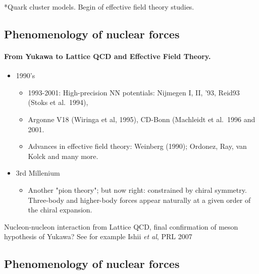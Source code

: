 \documentclass[%
twoside,                 %
final,                   %
10pt]{article}
\begin{document}
\noindent
*Quark cluster models. Begin of effective field theory studies.



\subsection*{Phenomenology of nuclear forces}

\paragraph{From Yukawa to Lattice QCD and Effective Field Theory.}

\begin{itemize}
\item 1990's
\begin{itemize}

  \item 1993-2001: High-precision NN potentials: Nijmegen I, II, '93, Reid93 (Stoks et al.~1994), 

  \item Argonne V18 (Wiringa et al, 1995), CD-Bonn (Machleidt et al.~1996 and 2001. 

  \item Advances in effective field theory: Weinberg (1990); Ordonez, Ray, van Kolck and many more.

\end{itemize}

\noindent
\item 3rd Millenium
\begin{itemize}

  \item Another "pion theory"; but now right: constrained by chiral symmetry. Three-body and higher-body forces appear naturally at a given order of the chiral expansion. 
\end{itemize}

\noindent
\end{itemize}

\noindent
Nucleon-nucleon interaction from Lattice QCD, final confirmation of meson hypothesis of Yukawa?  See for example Ishii \emph{et al}, PRL 2007




\subsection*{Phenomenology of nuclear forces}
\end{document}
